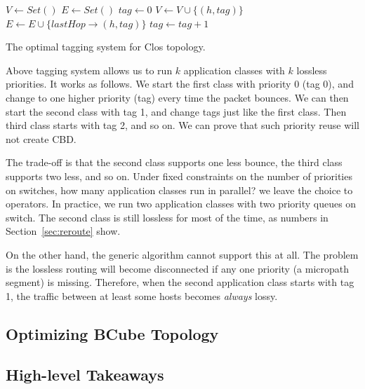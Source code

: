 \begin{algorithm}
	\small
	$V \gets Set()$\;
	$E \gets Set()$\; 
	 {
		$tag \gets 0$\;
		 {
			$V \gets V \cup \{(h, tag)\}$\;
			$E \gets E \cup \{lastHop\rightarrow(h, tag)\}$\;
			 {
				$tag \gets tag+1$\;
			}
		}
	}
	\;
    \caption{The optimal tagging system for Clos topology.}
	\label{alg:clos}
\end{algorithm}

Above tagging system allows us to run $k$ application classes with $k$ lossless priorities. 
It works as follows.
We start the first class with priority 0 (tag 0), and change to one higher priority (tag) every time the packet
bounces. We can then start the second class with tag 1, and change tags just like the first class. 
Then third class starts with tag 2, and so on. We can prove that such priority reuse will not create CBD.

The trade-off is that the second class supports one less bounce, the third class supports two less, and so on.
Under fixed constraints on the number of priorities on switches, how many application classes run in parallel?
we leave the choice to operators. In practice, we run two application classes with two priority 
queues on switch. The second class is still lossless for most of the time, as numbers in 
Section~\ref{sec:reroute} show.


On the other hand, the generic algorithm cannot support this at all. The problem is the lossless routing will 
become disconnected if any one priority (a micropath segment) is missing. Therefore, when the 
second application class starts with tag 1, the traffic between at least some hosts becomes 
{\em always} lossy.



\subsection{Optimizing BCube Topology}

\subsection{High-level Takeaways}


